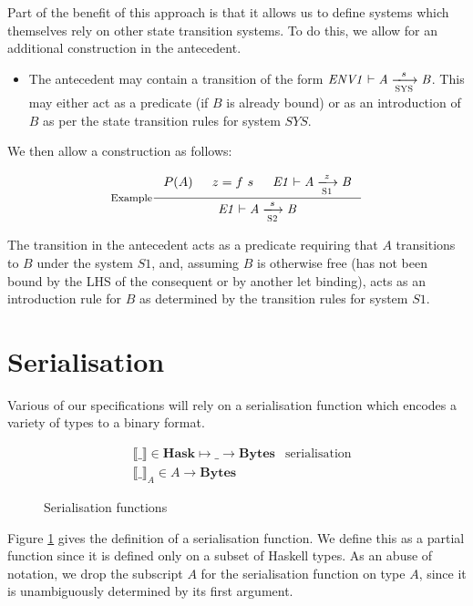 \documentclass[11pt,a4paper]{article}
\newcommand{\var}[1]{\mathit{#1}}
\newcommand{\bytes}{\textbf{Bytes}}
\theoremstyle{definition}
\theoremstyle{remark}
\begin{document}
Part of the benefit of this approach is that it allows us to define systems
which themselves rely on other state transition systems. To do this, we allow
for an additional construction in the antecedent.

\begin{itemize}
\item The antecedent may contain a transition of the form $\tion[ENV1]{SYS}{A}{s}{B}$.
    This may either act as a predicate (if $B$ is already bound) or as an
    introduction of $B$ as per the state transition rules for system $\var{SYS}$.
\end{itemize}

We then allow a construction as follows:

\[
  \inference[Example]
    {P(A) & z = f ~ s & \tion[E1]{S1}{A}{z}{B}}
    {\tion[E1]{S2}{A}{s}{B}}
\]

The transition in the antecedent acts as a predicate requiring that $A$
transitions to $B$ under the system $S1$, and, assuming $B$ is otherwise free
(has not been bound by the LHS of the consequent or by another let binding),
acts as an introduction rule for $B$ as determined by the transition rules for
system $S1$.

\section{Serialisation}
Various of our specifications will rely on a serialisation function which
encodes a variety of types to a binary format.

\begin{figure}[h]
  \label{fig:serialisation}
  \begin{align*}
    & \llbracket\_\rrbracket \in \textbf{Hask}\mapsto\_\to\bytes
    & \text{serialisation} \\
    & \llbracket\_\rrbracket_{A} \in \var{A}\to\bytes
  \end{align*}
  \caption{Serialisation functions}
\end{figure}

Figure \ref{fig:serialisation} gives the definition of a serialisation function.
We define this as a partial function since it is defined only on a subset of
Haskell types. As an abuse of notation, we drop the subscript $A$ for the
serialisation function on type $A$, since it is unambiguously determined by its
first argument.
\end{document}
